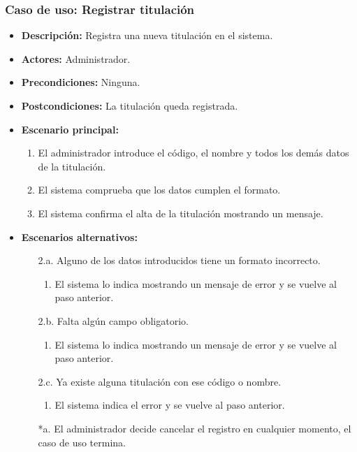 \documentclass{book}
\begin{document}
\subsubsection*{Caso de uso: Registrar titulación}
\begin{itemize}
\item{\bf Descripción:} Registra una nueva titulación en el sistema.
\item{\bf Actores:} Administrador.
\item{\bf Precondiciones:} Ninguna.
\item{\bf Postcondiciones:} La titulación queda registrada.
\item{\bf Escenario principal:}
\begin{enumerate}
\item El administrador introduce el código, el nombre y todos los demás datos de la titulación.
\item El sistema comprueba que los datos cumplen el formato.
\item El sistema confirma el alta de la titulación mostrando un mensaje.
\end{enumerate}
\item{\bf Escenarios alternativos:}
	\begin{itemize}
	\item[2.a.] Alguno de los datos introducidos tiene un formato incorrecto.
		\begin{enumerate}
		\item El sistema lo indica mostrando un mensaje de error y se vuelve al paso anterior.
		\end{enumerate}
	\item[2.b.] Falta algún campo obligatorio.
		\begin{enumerate}
		\item El sistema lo indica mostrando un mensaje de error y se vuelve al paso anterior.
		\end{enumerate}
	\item[2.c.] Ya existe alguna titulación con ese código o nombre.
		\begin{enumerate}
		\item El sistema indica el error y se vuelve al paso anterior.
		\end{enumerate}
	\item[*a.] El administrador decide cancelar el registro en cualquier momento, el caso de uso termina. 
	\end{itemize}
\end{itemize}
\end{document}
